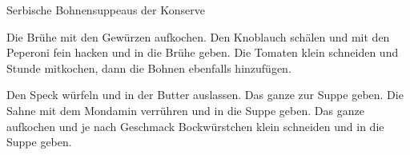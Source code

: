 \begin{recipe}{Serbische Bohnensuppe}{aus der Konserve}
  \inglist

  \steps
  Die Brühe mit den Gewürzen aufkochen. Den Knoblauch schälen und mit den Peperoni fein hacken und in die Brühe geben. Die Tomaten klein schneiden und \halb Stunde mitkochen, dann die Bohnen ebenfalls hinzufügen.

  Den Speck würfeln und in der Butter auslassen. Das ganze zur Suppe geben. Die Sahne mit dem Mondamin verrühren und in die Suppe geben. Das ganze aufkochen und je nach Geschmack Bockwürstchen klein schneiden und in die Suppe geben.
\end{recipe}
